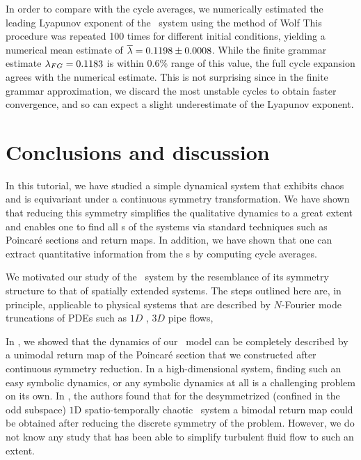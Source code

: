 \documentclass[aip,cha,
reprint,
secnumarabic,
nofootinbib, tightenlines,
nobibnotes, showkeys, showpacs,
superscriptaddress,
]{revtex4-1}
\begin{document}
{In order to compare with the cycle averages, we numerically estimated the
leading Lyapunov exponent of the \twomode\ system using the method of
Wolf \etal{} This procedure was repeated 100 times for
different initial conditions, yielding a numerical mean estimate of
$\overline{\lambda} = 0.1198 \pm 0.0008$. While the finite grammar
estimate $\lambda_{FG} = 0.1183$ is within $0.6\%$ range of this value,
the full cycle expansion agrees with the numerical estimate. This is not
surprising since in the finite grammar approximation, we discard the
most unstable cycles to obtain faster convergence, and so can expect 
a slight underestimate of the Lyapunov exponent.


\renewcommand{\zeit}{\ensuremath{\tau}}  %

\section{Conclusions and discussion}
\label{s:concl}

In this tutorial, we have studied a simple dynamical 
system that exhibits chaos and is equivariant under a continuous 
symmetry transformation. We have shown that reducing this symmetry 
simplifies the qualitative dynamics to a great extent and enables 
one to find all \rpo s of the systems via standard techniques such 
as Poincar\'e sections and return maps. In addition, we have shown 
that one can extract quantitative information from the \rpo s by 
computing cycle averages.

We motivated our study of the \twomode\ system by the resemblance of its
symmetry structure to that of spatially extended systems. The
steps outlined here are, in principle, applicable to physical systems
that are described by $N$-Fourier mode truncations of PDEs such as $1D$
\KS, $3D$ pipe flows, \etc

In , we showed that the dynamics of our \twomode\ model 
can be completely described by a unimodal return map of the Poincar\'e 
section that we constructed after continuous symmetry reduction. In a 
high-dimensional system, finding such an easy symbolic dynamics, 
or any symbolic dynamics at all is a challenging problem on its 
own. In , the authors found that for 
the desymmetrized (confined in the odd subspace) $1$D 
spatio-temporally chaotic \KS\ system a bimodal return map could 
be obtained after reducing the discrete symmetry of the 
problem. However, we do not know any study that has been able to 
simplify turbulent fluid flow to such an extent.

}
\end{document}
